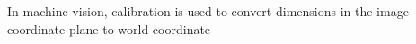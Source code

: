 \documentclass{article}
\begin{document}
	
	In machine vision, calibration is used to convert dimensions in the image coordinate plane to world coordinate \cite{moru2020machine}
	\newpage
	
	
\end{document}
